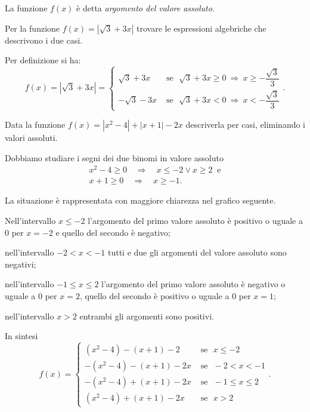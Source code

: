 La funzione $f(x)$ è detta \textit{argomento del valore assoluto}.

\begin{exrig}
\begin{esempio}
Per la funzione $f(x)=\left|\sqrt 3+3x\right|$ trovare le espressioni algebriche che descrivono i due casi.

Per definizione si ha: 
\[f(x)=\left|\sqrt 3+3x\right|=\begin{cases}\sqrt 3+3x & \text{ se~~}\sqrt 3+3x\ge 0\:\Rightarrow\: x\ge -\dfrac{\sqrt 3} 3\\-\sqrt 3-3x & \text{ se~~}\sqrt 3+3x<0\:\Rightarrow\: x<-\dfrac{\sqrt 3} 3\end{cases}.\]
\end{esempio}
\pagebreak
\begin{esempio}
Data la funzione $f(x)=\left|x^2-4\right|+\left|x+1\right|-2x$ descriverla per casi, eliminando i valori assoluti.

Dobbiamo studiare i segni dei due binomi in valore assoluto 
\[\begin{array}{l}x^2-4\ge 0\quad\Rightarrow\quad x\le -2\vee x\ge 2~\text{ e} \\x+1\ge 0\quad\Rightarrow\quad x\ge -1.\end{array}\]

La situazione è rappresentata con maggiore chiarezza nel grafico seguente.
\begin{center}

\end{center}

\begin{itemize*}
\item Nell'intervallo $x\le -2$ l'argomento del primo valore assoluto è positivo o uguale a 0 per $x=-2$ e quello del secondo è negativo;
\item nell'intervallo $-2<x<-1$ tutti e due gli argomenti del valore assoluto sono negativi;
\item nell'intervallo $-1\le x\le 2$ l'argomento del primo valore assoluto è negativo o uguale a 0 per $x=2$, quello del secondo è positivo o uguale a 0 per $x=1$;
\item nell'intervallo $x>2$ entrambi gli argomenti sono positivi.
\end{itemize*}
In sintesi 
\[f(x)=
\begin{cases}(x^2-4)-(x+1)-2 & \text{ se~~}x\le -2 \\
-(x^2-4)-(x+1)-2x & \text{ se~~}-2<x<-1 \\
-(x^2-4)+(x+1)-2x & \text{ se~~}-1\le x\le 2 \\
(x^2-4)+(x+1)-2x & \text{ se~~}x>2
\end{cases}.\]
\end{esempio}
\end{exrig}
\ovalbox{\risolvii \ref{ese:7.1}, \ref{ese:7.2}, \ref{ese:7.3}}

